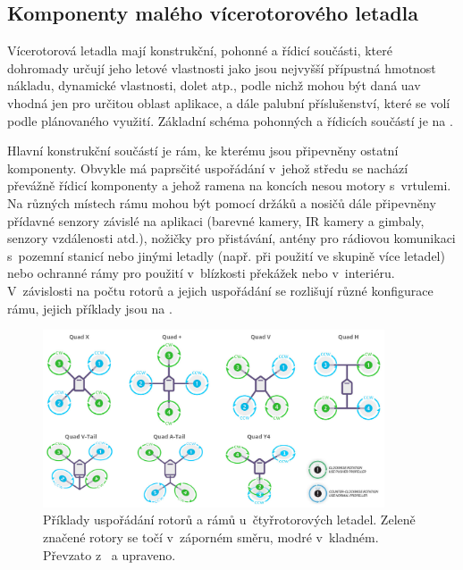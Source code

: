 \subsection{Komponenty malého vícerotorového letadla}
Vícerotorová letadla mají konstrukční, pohonné a řídicí součásti, které dohromady určují jeho letové vlastnosti jako jsou nejvyšší přípustná hmotnost nákladu, dynamické vlastnosti, dolet atp., podle nichž mohou být daná \acrshort{uav} vhodná jen pro určitou oblast aplikace, a dále palubní příslušenství, které se volí podle plánovaného využití. Základní schéma pohonných a řídicích součástí je na .

Hlavní konstrukční součástí je rám, ke kterému jsou připevněny ostatní komponenty. Obvykle má paprsčité uspořádání v~jehož středu se nachází převážně řídicí komponenty a jehož ramena na koncích nesou motory s~vrtulemi. Na různých místech rámu mohou být pomocí držáků a nosičů dále připevněny přídavné senzory závislé na aplikaci (barevné kamery, IR kamery a gimbaly, senzory vzdálenosti atd.), nožičky pro přistávání, antény pro rádiovou komunikaci s~pozemní stanicí nebo jinými letadly (např. při použití ve skupině více letadel) nebo ochranné rámy pro použití v~blízkosti překážek nebo v~interiéru. V~závislosti na počtu rotorů a jejich uspořádání se rozlišují různé konfigurace rámu, jejich příklady jsou na .
\begin{figure}
    \centering
    \includegraphics[width=0.9\textwidth]{img/intro/konfigurace.jpg}
    \caption[Uspořádání rotorů rámů u~čtyřrotorových letadel]{Příklady uspořádání rotorů a rámů u~čtyřrotorových letadel. Zeleně značené rotory se točí v~záporném směru, modré v~kladném. Převzato z~\cite{ardupilot} a upraveno.}
    \label{fig:konfigurace}
\end{figure}

